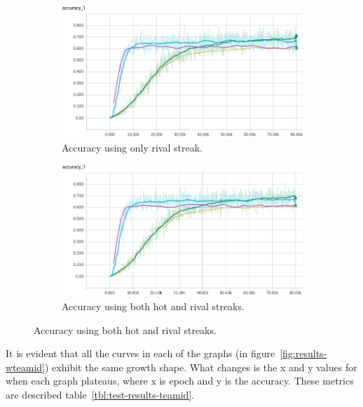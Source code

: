 \documentclass{article} %
\begin{document}
\begin{figure}[!htb]
  \begin{subfigure}{0.5\textwidth}
    \includegraphics[width=\linewidth]{plots/model1/wteam_onehot/streak-r/accuracy.png}
    \caption{Accuracy using only rival streak.}\label{fig:wteam-onehot-r-accuracy}
  \end{subfigure}
  \begin{subfigure}{0.5\textwidth}
    \includegraphics[width=\linewidth]{plots/model1/wteam_onehot/streak-hr/accuracy.png}
    \caption{Accuracy using both hot and rival streaks.}\label{fig:wteam-onehot-hr-accuracy}
  \end{subfigure}
\end{figure}
\label{fig:results-wteamid}


It is evident that all the curves in each of the graphs (in figure~\ref{fig:results-wteamid}) exhibit the same growth shape.
What changes is the x and y values for when each graph plateaus, where x is epoch and y is the accuracy.
These metrics are described table~\ref{tbl:test-results-teamid}.
\end{document}
